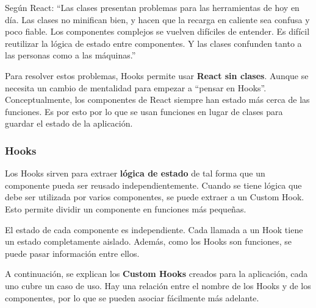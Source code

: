 \documentclass[12pt,twoside,titlepage]{report}
\begin{document}
Según React: ``Las clases presentan problemas para las herramientas de hoy en día. Las clases no minifican bien, y hacen que la recarga en caliente sea confusa y poco fiable. Los componentes complejos se vuelven difíciles de entender. Es difícil reutilizar la lógica de estado entre componentes. Y las clases confunden tanto a las personas como a las máquinas.'' 

Para resolver estos problemas, Hooks permite usar \textbf{React sin clases}. Aunque se necesita un cambio de mentalidad para empezar a “pensar en Hooks”. Conceptualmente, los componentes de React siempre han estado más cerca de las funciones. Es por esto por lo que se usan funciones en lugar de clases para guardar el estado de la aplicación.
\cite{hooks1}

\subsubsection{Hooks}

Los Hooks sirven para extraer \textbf{lógica de estado} de tal forma que un componente pueda ser reusado independientemente. Cuando se tiene lógica que debe ser utilizada por varios componentes, se puede extraer a un Custom Hook. Esto permite dividir un componente en funciones más pequeñas.
\cite{hooks3}

El estado de cada componente es independiente. Cada llamada a un Hook tiene un estado completamente aislado. Además, como los Hooks son funciones, se puede pasar información entre ellos.
\cite{hooks2}

A continuación, se explican los \textbf{Custom Hooks} creados para la aplicación, cada uno cubre un caso de uso. Hay una relación entre el nombre de los Hooks y de los componentes, por lo que se pueden asociar fácilmente más adelante.

\end{document}
